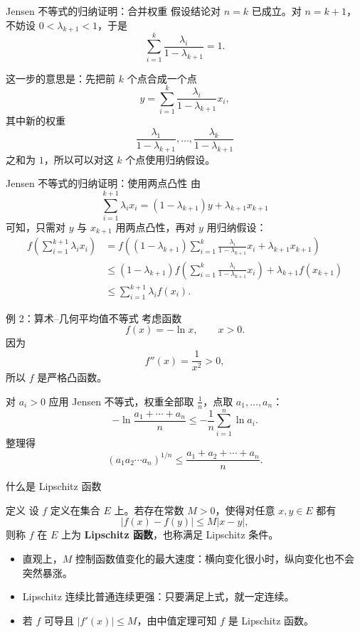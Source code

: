 \documentclass[aspectratio=169,11pt]{ctexbeamer}
\begin{document}
\begin{frame}{Jensen 不等式的归纳证明：合并权重}
\small
假设结论对 $n=k$ 已成立。对 $n=k+1$，不妨设
$0<\lambda_{k+1}<1$，于是
\[
  \sum_{i=1}^{k}\frac{\lambda_i}{1-\lambda_{k+1}}=1.
\]

这一步的意思是：先把前 $k$ 个点合成一个点
\[
  y=\sum_{i=1}^{k}\frac{\lambda_i}{1-\lambda_{k+1}}x_i,
\]
其中新的权重
\[
  \frac{\lambda_1}{1-\lambda_{k+1}},\dots,
  \frac{\lambda_k}{1-\lambda_{k+1}}
\]
之和为 $1$，所以可以对这 $k$ 个点使用归纳假设。
\end{frame}

\begin{frame}{Jensen 不等式的归纳证明：使用两点凸性}
\small
由
\[
  \sum_{i=1}^{k+1}\lambda_i x_i
  =(1-\lambda_{k+1})y+\lambda_{k+1}x_{k+1}
\]
可知，只需对 $y$ 与 $x_{k+1}$ 用两点凸性，再对 $y$ 用归纳假设：
\[
\begin{aligned}
f\!\left(\sum_{i=1}^{k+1}\lambda_i x_i\right)
&=f\!\left((1-\lambda_{k+1})
 \sum_{i=1}^{k}\frac{\lambda_i}{1-\lambda_{k+1}}x_i
 +\lambda_{k+1}x_{k+1}\right)\\
&\le (1-\lambda_{k+1})
 f\!\left(\sum_{i=1}^{k}\frac{\lambda_i}{1-\lambda_{k+1}}x_i\right)
 +\lambda_{k+1}f(x_{k+1})\\
&\le \sum_{i=1}^{k+1}\lambda_i f(x_i).
\end{aligned}
\]
\end{frame}

\begin{frame}{例 2：算术--几何平均值不等式}
\small
考虑函数
\[
  f(x)=-\ln x,\qquad x>0.
\]
因为
\[
  f''(x)=\frac1{x^2}>0,
\]
所以 $f$ 是严格凸函数。

对 $a_i>0$ 应用 Jensen 不等式，权重全部取 $\frac1n$，点取 $a_1,\dots,a_n$：
\[
  -\ln\frac{a_1+\cdots+a_n}{n}
  \le
  -\frac1n\sum_{i=1}^n\ln a_i.
\]
整理得
\[
  (a_1a_2\cdots a_n)^{1/n}
  \le
  \frac{a_1+a_2+\cdots+a_n}{n}.
\]
\end{frame}

\begin{frame}{什么是 Lipschitz 函数}
\small
\begin{block}{定义}
设 $f$ 定义在集合 $E$ 上。若存在常数 $M>0$，使得对任意 $x,y\in E$ 都有
\[
  |f(x)-f(y)|\le M|x-y|,
\]
则称 $f$ 在 $E$ 上为 \textbf{Lipschitz 函数}，也称满足 Lipschitz 条件。
\end{block}

\begin{itemize}
  \item 直观上，$M$ 控制函数值变化的最大速度：横向变化很小时，纵向变化也不会突然暴涨。
  \item Lipschitz 连续比普通连续更强：只要满足上式，就一定连续。
  \item 若 $f$ 可导且 $|f'(x)|\le M$，由中值定理可知 $f$ 是 Lipschitz 函数。
\end{itemize}
\end{frame}
\end{document}
